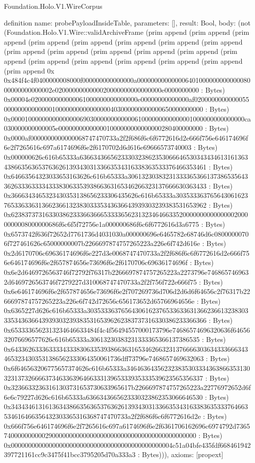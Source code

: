 \begin{lexlean}{Foundation.Holo.V1.WireCorpus}
\begin{semanticmodule}
definition{
  name: probePayloadInsideTable,
  parameters: [],
  result: Bool,
  body: (not (Foundation.Holo.V1.Wire::validArchiveFrame (prim append (prim append (prim append (prim append (prim append (prim append (prim append (prim append (prim append (prim append (prim append (prim append (prim append (prim append (prim append (prim append (prim append (prim append (prim append (prim append 0x 0x484f4c4f0400000008000f000000000000000a00000000000000640100000000000008000000000000002e0200000000000020000000000000000e0000000000 : Bytes) 0x00004e0200000000000061000000000000000e00000000000000af02000000000000550000000000000010000000000000000403000000000000650000000000 : Bytes) 0x00001000000000000000690300000000000061000000000000001000000000000000ca030000000000005e000000000000001000000000000000280400000000 : Bytes) 0x0000af0000000000000068747470733a2f2f686f6c6f6772616d2e666f756e646174696f6e2f7265616c697a6174696f6e2f6170702d6d616e69666573740003 : Bytes) 0x000000626c616b65333a636634366562333032386235306664653034343461316136343866356365376362613934303133663534316338363533376466353461 : Bytes) 0x64663564323033653163626c616b65333a3061323038323133336536613738653564336263336333343338306335393866363165346266323137666630363433 : Bytes) 0x3666343465323430353138656233306435626c616b65333a30353336376564306162376533633631366236613238303335343636643939303239383531653962 : Bytes) 0x6238373731633038623336636665333365623132346466335200000000000000020000000008000000686f6c6f5f72756e1a000000686f6c6f6772616d3a6775 : Bytes) 0x6573742f636f72652d7761736d4031030a000000696e6465782e68746d6c08000000706f727461626c65000000007b2266697874757265223a226e6f742d616e : Bytes) 0x2d6170706c69636174696f6e227d3e0068747470733a2f2f686f6c6f6772616d2e666f756e646174696f6e2f657874656e73696f6e2f6170706c69636174696f : Bytes) 0x6e2d6469726563746f72792f76317b2266697874757265223a2273796e7468657469632d6469726563746f7279227d310068747470733a2f2f756f722e666f75 : Bytes) 0x6e646174696f6e2f657874656e73696f6e2f707269736d706d2d6d6f64656c2f76317b2266697874757265223a226e6f742d72656c656173652d65766964656e : Bytes) 0x6365227d626c616b65333a3035333637656430616237653363363136623661323830333534363664393930323938353165396262383737316330386233366366 : Bytes) 0x6533336562313234646633484f4c4f56494557000173796e74686574696320636f6465632076696577626c616b65333a30613230383231333365366137386535 : Bytes) 0x6433626333633334333830633539386636316534626632313766663036343336663434653234303531386562333064350061736dff73796e7468657469632063 : Bytes) 0x6f646563206775657374626c616b65333a3464636435623238353033343638663531303231373266663734633639646633313965333935333539623565356337 : Bytes) 0x32366332363161303731653730633965617b2266697874757265223a22776972652d6f6e6c79227d626c616b65333a6366343665623330323862353066646530 : Bytes) 0x343434613161363438663563653763626139343031336635343163383635333764663534616466356432303365316368747470733a2f2f686f6c6f6772616d2e : Bytes) 0x666f756e646174696f6e2f7265616c697a6174696f6e2f6361706162696c6974792d736574000000000029000000000000000000000000000000000000000000 : Bytes) 0x00000000000000000000000000000000000000000000004c51a04bfe435fdf668461942397721161cc9c3475f41bcc3795205d70a333a3 : Bytes))),
  axioms: [propext]
}


\end{semanticmodule}
\end{lexlean}
